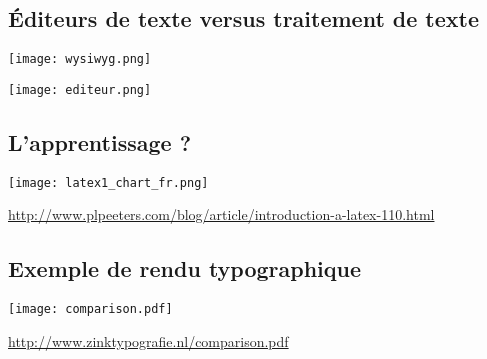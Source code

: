 \subsection{Éditeurs de texte versus traitement de texte}

\begin{slide}
  \texttt{[image: wysiwyg.png]}
\end{slide} 
\begin{slide}
  \texttt{[image: editeur.png]}
\end{slide}

\subsection{L'apprentissage ?}

\begin{slide}
	\centering \texttt{[image: latex1\_chart\_fr.png]}

	\url{http://www.plpeeters.com/blog/article/introduction-a-latex-110.html}
\end{slide}

\subsection{Exemple de rendu typographique}
\begin{slide}
  \centering
  \texttt{[image: comparison.pdf]}
  
  \url{http://www.zinktypografie.nl/comparison.pdf}
\end{slide}
